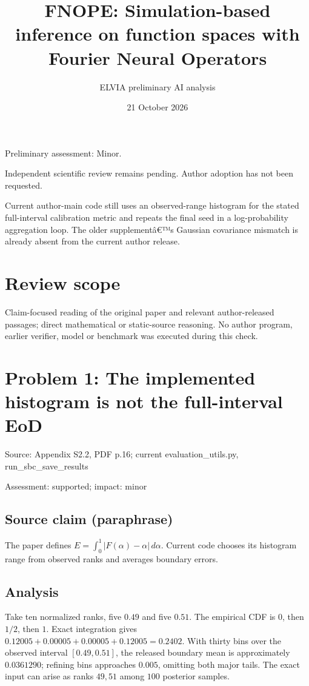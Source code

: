 \documentclass[11pt]{article}
\begin{document}
\title{FNOPE: Simulation-based inference on function spaces with Fourier Neural Operators}

\author{ELVIA preliminary AI analysis}\date{21 October 2026}\maketitle

Preliminary assessment: Minor.\par

Independent scientific review remains pending. Author adoption has not been requested.

Current author-main code still uses an observed-range histogram for the stated full-interval calibration metric and repeats the final seed in a log-probability aggregation loop. The older supplementâ€™s Gaussian covariance mismatch is already absent from the current author release.

\section*{Review scope}

Claim-focused reading of the original paper and relevant author-released passages; direct mathematical or static-source reasoning. No author program, earlier verifier, model or benchmark was executed during this check.

\section*{Problem 1: The implemented histogram is not the full-interval EoD}

Source: Appendix S2.2, PDF p.16; current evaluation\_utils.py, run\_sbc\_save\_results

Assessment: supported; impact: minor

\subsection*{Source claim (paraphrase)}

The paper defines \(E=\int_0^1|F(\alpha)-\alpha|\,d\alpha\). Current code chooses its histogram range from observed ranks and averages boundary errors.

\subsection*{Analysis}

Take ten normalized ranks, five \(0.49\) and five \(0.51\). The empirical CDF is \(0\), then \(1/2\), then \(1\). Exact integration gives \(0.12005+0.00005+0.00005+0.12005=0.2402\). With thirty bins over the observed interval \([0.49,0.51]\), the released boundary mean is approximately \(0.0361290\); refining bins approaches \(0.005\), omitting both major tails. The exact input can arise as ranks \(49,51\) among \(100\) posterior samples.
\end{document}
